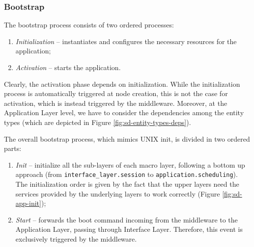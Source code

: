\subsubsection{Bootstrap}

The bootstrap process consists of two ordered processes:

\begin{enumerate}
  \item \textit{Initialization} -- instantiates and configures the necessary
    resources for the application;
  \item \textit{Activation} -- starts the application.
\end{enumerate}

Clearly, the activation phase depends on initialization.
While the initialization process is automatically triggered at node creation,
this is not the case for activation, which is instead triggered by the
middleware.
Moreover, at the Application Layer level, we have to consider the dependencies
among the entity types (which are depicted in Figure
\ref{fig:sd-entity-types-deps}).

The overall bootstrap process, which mimics UNIX init\cite{online-tlsag},
is divided in two ordered parts:
\begin{enumerate}
  \item \textit{Init} -- initialize all the sub-layers of each macro layer,
  following a bottom up approach (from \verb|interface_layer.session| to
  \verb|application.scheduling|).
  The initialization order is given by the fact that the upper
  layers need the services provided by the underlying layers to work
  correctly (Figure \ref{fig:sd-app-init});
  \item \textit{Start} -- forwards the boot command incoming from the
  middleware to the Application Layer, passing through Interface Layer.
  Therefore, this event is exclusively triggered by the middleware.
\end{enumerate}

